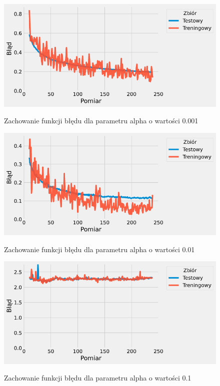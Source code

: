 \documentclass{article}
\begin{document}
\begin{figure}[H]
	\centering
	\caption{Zachowanie funkcji błędu dla parametru alpha o wartości 0.001}
	\includegraphics[width=\textwidth]{alpha_err_0001.png}
	\label{fig:res44}
\end{figure}
\begin{figure}[H]
	\centering
	\caption{Zachowanie funkcji błędu dla parametru alpha o wartości 0.01}
	\includegraphics[width=\textwidth]{alpha_err_001.png}
	\label{fig:res45}
\end{figure}
\begin{figure}[H]
	\centering
	\caption{Zachowanie funkcji błędu dla parametru alpha o wartości 0.1}
	\includegraphics[width=\textwidth]{alpha_err_01.png}
	\label{fig:res46}
\end{figure}
\end{document}
